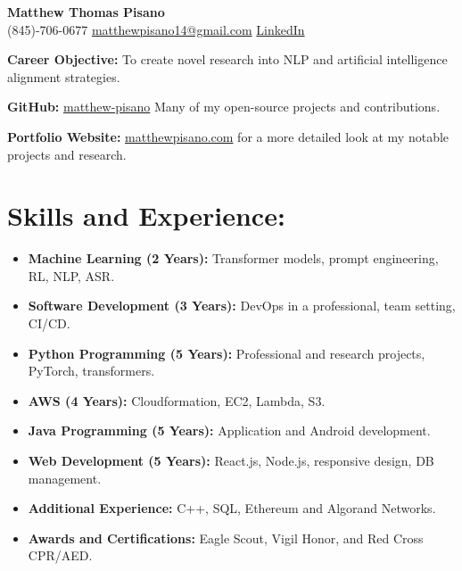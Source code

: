 \documentclass[12pt]{article}
\title{}
\author{\textbf{\LARGE Matthew Thomas Pisano}}
\date{}
\begin{document}
\pagestyle{plain}

\begin{tcolorbox}[width=\linewidth, sharp corners=all, colback=white!90!green, colframe=black]
    
    \begin{center}
        \textbf{\LARGE Matthew Thomas Pisano}\\
        \vspace{0.1in}
        (845)-706-0677 \hspace*{0.3in}
        \href{mailto:matthewpisano14@gmail.com}{matthewpisano14@gmail.com} \hspace*{0.5in}
        \href{https://www.linkedin.com/in/matthew-pisano/}{LinkedIn}
    \end{center}
    
\end{tcolorbox}

\vspace{0.1in}

\hspace*{-0.3in}
\textbf{Career Objective:} To create novel research into NLP and artificial intelligence alignment strategies.

\vspace{0.1in}

\hspace*{-0.3in}
\textbf{GitHub:} \href{https://github.com/matthew-pisano}{matthew-pisano} Many of my open-source projects and contributions.

\hspace*{-0.3in}
\textbf{Portfolio Website:} \href{https://matthewpisano.com}{matthewpisano.com} for a more detailed look at my notable projects and research.

\section*{Skills and Experience:}
\begin{itemize}
    \itemsep0em
    \item \textbf{Machine Learning (2 Years):} Transformer models, prompt engineering, RL, NLP, ASR.
    \item \textbf{Software Development (3 Years):} DevOps in a professional, team setting, CI/CD. 
    \item \textbf{Python Programming (5 Years):} Professional and research projects, PyTorch, transformers.
    \item \textbf{AWS (4 Years):} Cloudformation, EC2, Lambda, S3.
    \item \textbf{Java Programming (5 Years):} Application and Android development.
    \item \textbf{Web Development (5 Years):} React.js, Node.js, responsive design, DB management.
    \item \textbf{Additional Experience:} C++, SQL, Ethereum and Algorand Networks.
    \item \textbf{Awards and Certifications:} Eagle Scout, Vigil Honor, and Red Cross CPR/AED.
\end{itemize}
\end{document}
